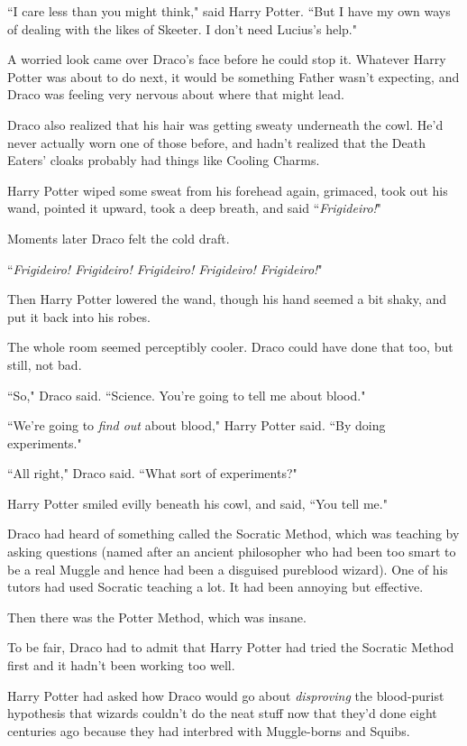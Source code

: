 ``I care less than you might think," said Harry Potter. ``But I have my own ways of dealing with the likes of Skeeter. I don't need Lucius's help."

A worried look came over Draco's face before he could stop it. Whatever Harry Potter was about to do next, it would be something Father wasn't expecting, and Draco was feeling very nervous about where that might lead.

Draco also realized that his hair was getting sweaty underneath the cowl. He'd never actually worn one of those before, and hadn't realized that the Death Eaters' cloaks probably had things like Cooling Charms.

Harry Potter wiped some sweat from his forehead again, grimaced, took out his wand, pointed it upward, took a deep breath, and said ``\emph{Frigideiro!}"

Moments later Draco felt the cold draft.

``\emph{Frigideiro! Frigideiro! Frigideiro! Frigideiro! Frigideiro!}"

Then Harry Potter lowered the wand, though his hand seemed a bit shaky, and put it back into his robes.

The whole room seemed perceptibly cooler. Draco could have done that too, but still, not bad.

``So," Draco said. ``Science. You're going to tell me about blood."

``We're going to \emph{find out} about blood," Harry Potter said. ``By doing experiments."

``All right," Draco said. ``What sort of experiments?"

Harry Potter smiled evilly beneath his cowl, and said, ``You tell me."

\later

Draco had heard of something called the Socratic Method, which was teaching by asking questions (named after an ancient philosopher who had been too smart to be a real Muggle and hence had been a disguised pureblood wizard). One of his tutors had used Socratic teaching a lot. It had been annoying but effective.

Then there was the Potter Method, which was insane.

To be fair, Draco had to admit that Harry Potter had tried the Socratic Method first and it hadn't been working too well.

Harry Potter had asked how Draco would go about \emph{disproving} the blood-purist hypothesis that wizards couldn't do the neat stuff now that they'd done eight centuries ago because they had interbred with Muggle-borns and Squibs.

